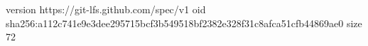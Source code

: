 version https://git-lfs.github.com/spec/v1
oid sha256:a112c741e9e3dee295715bcf3b549518bf2382e328f31c8afca51cfb44869ae0
size 72
